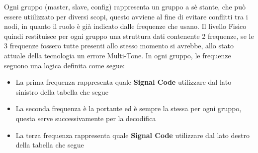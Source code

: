 Ogni gruppo (master, slave, config) rappresenta un gruppo a sè stante, che può essere utiilizzato per diversi scopi, 
questo avviene al fine di evitare conflitti tra i nodi, in quanto il ruolo è già indicato dalle frequenze che usano.
Il livello Fisico quindi restituisce per ogni gruppo una struttura dati contenente 2 frequenze, se le 3 frequenze fossero tutte presenti allo stesso momento si avrebbe,
allo stato attuale della tecnologia un errore Multi-Tone.
In ogni gruppo, le frequenze seguono una logica definita come segue:
\begin{itemize}
\item La prima frequenza rappresenta quale \textbf{Signal Code} utilizzare dal lato sinistro della tabella che segue
\item La seconda frequenza è la portante ed è sempre la stessa per ogni gruppo, questa serve successivamente per la decodifica
\item La terza frequenza rappresenta quale \textbf{Signal Code} utilizzare dal lato destro della tabella che segue
\end{itemize}



